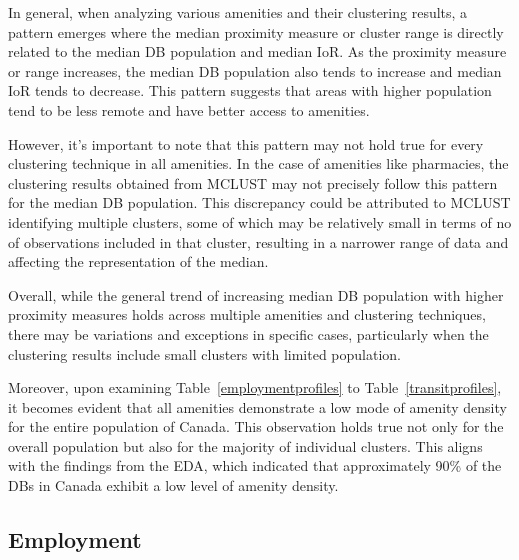 \documentclass[11pt, a4paper]{article}
\begin{document}
In general, when analyzing various amenities and their clustering results, a pattern emerges where the median proximity measure or cluster range is directly related to the median DB population and median IoR. As the proximity measure or range increases, the median DB population also tends to increase and median IoR tends to decrease. This pattern suggests that areas with higher population tend to be less remote and have better access to amenities.
\par
However, it's important to note that this pattern may not hold true for every clustering technique in all amenities. In the case of amenities like pharmacies, the clustering results obtained from MCLUST may not precisely follow this pattern for the median DB population. This discrepancy could be attributed to MCLUST identifying multiple clusters, some of which may be relatively small in terms of no of observations included in that cluster, resulting in a narrower range of data and affecting the representation of the median.
\par
Overall, while the general trend of increasing median DB population with higher proximity measures holds across multiple amenities and clustering techniques, there may be variations and exceptions in specific cases, particularly when the clustering results include small clusters with limited population.
\par
Moreover, upon examining Table~\ref{employmentprofiles} to Table~\ref{transitprofiles}, it becomes evident that all amenities demonstrate a low mode of amenity density for the entire population of Canada. This observation holds true not only for the overall population but also for the majority of individual clusters. This aligns with the findings from the EDA, which indicated that approximately 90\% of the DBs in Canada exhibit a low level of amenity density.









\subsection{Employment}
\end{document}
